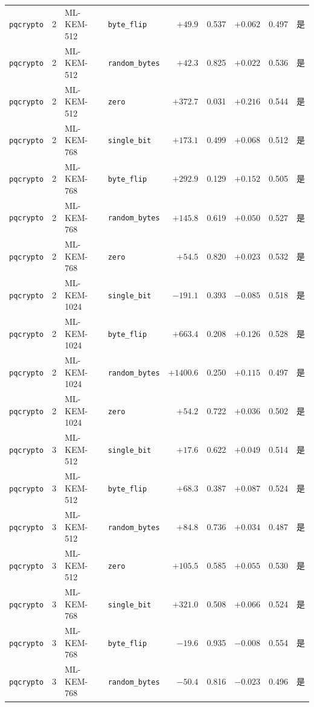 \documentclass[a4paper,fontset=none]{ctexart}
\begin{document}
{\begin{longtable}[c]{lllp{2.1cm}rrrrr}
  \texttt{pqcrypto} & 2 & ML-KEM-512 & \texttt{byte\_flip} & $+49.9$ & 0.537 & $+0.062$ & 0.497 & 是 \\
  \texttt{pqcrypto} & 2 & ML-KEM-512 & \texttt{random\_bytes} & $+42.3$ & 0.825 & $+0.022$ & 0.536 & 是 \\
  \texttt{pqcrypto} & 2 & ML-KEM-512 & \texttt{zero} & $+372.7$ & 0.031 & $+0.216$ & 0.544 & 是 \\
  \texttt{pqcrypto} & 2 & ML-KEM-768 & \texttt{single\_bit} & $+173.1$ & 0.499 & $+0.068$ & 0.512 & 是 \\
  \texttt{pqcrypto} & 2 & ML-KEM-768 & \texttt{byte\_flip} & $+292.9$ & 0.129 & $+0.152$ & 0.505 & 是 \\
  \texttt{pqcrypto} & 2 & ML-KEM-768 & \texttt{random\_bytes} & $+145.8$ & 0.619 & $+0.050$ & 0.527 & 是 \\
  \texttt{pqcrypto} & 2 & ML-KEM-768 & \texttt{zero} & $+54.5$ & 0.820 & $+0.023$ & 0.532 & 是 \\
  \texttt{pqcrypto} & 2 & ML-KEM-1024 & \texttt{single\_bit} & $-191.1$ & 0.393 & $-0.085$ & 0.518 & 是 \\
  \texttt{pqcrypto} & 2 & ML-KEM-1024 & \texttt{byte\_flip} & $+663.4$ & 0.208 & $+0.126$ & 0.528 & 是 \\
  \texttt{pqcrypto} & 2 & ML-KEM-1024 & \texttt{random\_bytes} & $+1400.6$ & 0.250 & $+0.115$ & 0.497 & 是 \\
  \texttt{pqcrypto} & 2 & ML-KEM-1024 & \texttt{zero} & $+54.2$ & 0.722 & $+0.036$ & 0.502 & 是 \\
  \texttt{pqcrypto} & 3 & ML-KEM-512 & \texttt{single\_bit} & $+17.6$ & 0.622 & $+0.049$ & 0.514 & 是 \\
  \texttt{pqcrypto} & 3 & ML-KEM-512 & \texttt{byte\_flip} & $+68.3$ & 0.387 & $+0.087$ & 0.524 & 是 \\
  \texttt{pqcrypto} & 3 & ML-KEM-512 & \texttt{random\_bytes} & $+84.8$ & 0.736 & $+0.034$ & 0.487 & 是 \\
  \texttt{pqcrypto} & 3 & ML-KEM-512 & \texttt{zero} & $+105.5$ & 0.585 & $+0.055$ & 0.530 & 是 \\
  \texttt{pqcrypto} & 3 & ML-KEM-768 & \texttt{single\_bit} & $+321.0$ & 0.508 & $+0.066$ & 0.524 & 是 \\
  \texttt{pqcrypto} & 3 & ML-KEM-768 & \texttt{byte\_flip} & $-19.6$ & 0.935 & $-0.008$ & 0.554 & 是 \\
  \texttt{pqcrypto} & 3 & ML-KEM-768 & \texttt{random\_bytes} & $-50.4$ & 0.816 & $-0.023$ & 0.496 & 是 \\

\end{longtable}}
\end{document}
